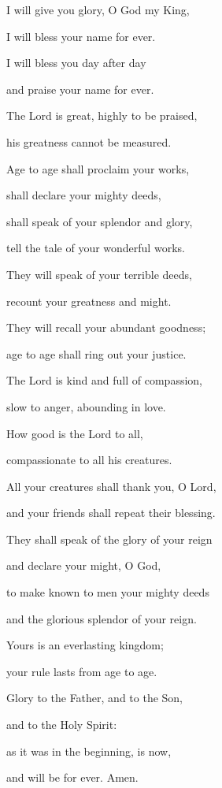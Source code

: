 \noindent I will give you glory, O God my King,~\GreStar{}~\nopagebreak

I will bless your name for ever.

\noindent I will bless you day after day~\GreStar{}~\nopagebreak

and praise your name for ever.

\noindent The Lord is great, highly to be praised,~\GreStar{}~\nopagebreak

his greatness cannot be measured.

\noindent Age to age shall proclaim your works,~\GreStar{}~\nopagebreak

shall declare your mighty deeds,

\noindent shall speak of your splendor and glory,~\GreStar{}~\nopagebreak

tell the tale of your wonderful works.

\noindent They will speak of your terrible deeds,~\GreStar{}~\nopagebreak

recount your greatness and might.

\noindent They will recall your abundant goodness;~\GreStar{}~\nopagebreak

age to age shall ring out your justice.

\noindent The Lord is kind and full of compassion,~\GreStar{}~\nopagebreak

slow to anger, abounding in love.

\noindent How good is the Lord to all,~\GreStar{}~\nopagebreak

compassionate to all his creatures.

\noindent All your creatures shall thank you, O Lord,~\GreStar{}~\nopagebreak

and your friends shall repeat their blessing.

\noindent They shall speak of the glory of your reign~\GreStar{}~\nopagebreak

and declare your might, O God,

\noindent to make known to men your mighty deeds~\GreStar{}~\nopagebreak

and the glorious splendor of your reign.

\noindent Yours is an everlasting kingdom;~\GreStar{}~\nopagebreak

your rule lasts from age to age.

\noindent Glory to the Father, and to the Son,~\GreStar{}~\nopagebreak

and to the Holy Spirit:

\noindent as it was in the beginning, is now,~\GreStar{}~\nopagebreak

and will be for ever. Amen.

